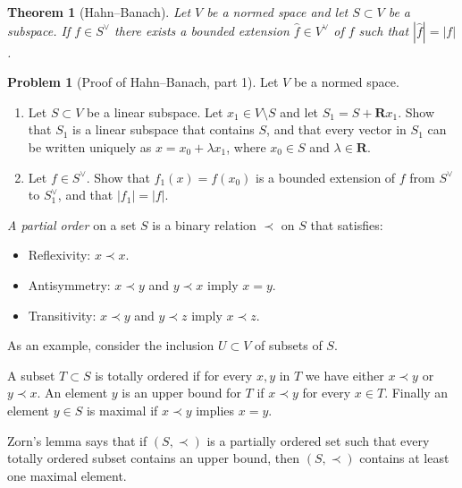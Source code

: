 \documentclass[11pt]{article}
\newtheorem*{theo}{Theorem}
\theoremstyle{definition}
\newtheorem{prob}{Problem}
\newcommand{\kk}[1]{\mathbf{#1}}
\begin{document}
\begin{theo}[Hahn--Banach]
Let $V$ be a normed space and let $S \subset V$ be a subspace.
If $f \in S^\vee$ there exists a bounded extension $\hat f \in V^\vee$ of $f$
such that $|\hat f| = |f|$.
\end{theo}

\begin{prob}[Proof of Hahn--Banach, part 1]
Let $V$ be a normed space.
\begin{enumerate}
\item
Let $S \subset V$ be a linear subspace.
Let $x_1 \in V \setminus S$ and let $S_1 = S + \kk R x_1$.
Show that $S_1$ is a linear subspace that contains $S$, and that every vector
in $S_1$ can be written uniquely as $x = x_0 + \lambda x_1$, where $x_0 \in S$
and $\lambda \in \kk R$.

\item
Let $f \in S^\vee$.
Show that $f_1(x) = f(x_0)$ is a bounded extension of $f$ from $S^\vee$ to
$S_1^\vee$, and that $|f_1| = |f|$.
\end{enumerate}
\end{prob}

\emph{A partial order} on a set $S$ is a binary relation $\prec$
on $S$ that satisfies:
\begin{itemize}
\item
Reflexivity: $x \prec x$.

\item
Antisymmetry:
$x \prec y$ and $y \prec x$ imply $x = y$.

\item
Transitivity:
$x \prec y$ and $y \prec z$ imply $x \prec z$.
\end{itemize}
As an example, consider the inclusion $U \subset V$ of subsets of $S$.

A subset $T \subset S$ is totally ordered if for every $x,y$ in $T$ we have
either $x \prec y$ or $y \prec x$.
An element $y$ is an upper bound for $T$ if $x \prec y$ for every $x \in T$.
Finally an element $y \in S$ is maximal if $x \prec y$ implies $x = y$.

Zorn's lemma says that if $(S,\prec)$ is a partially ordered set such that
every totally ordered subset contains an upper bound, then $(S,\prec)$ contains
at least one maximal element.
\end{document}
